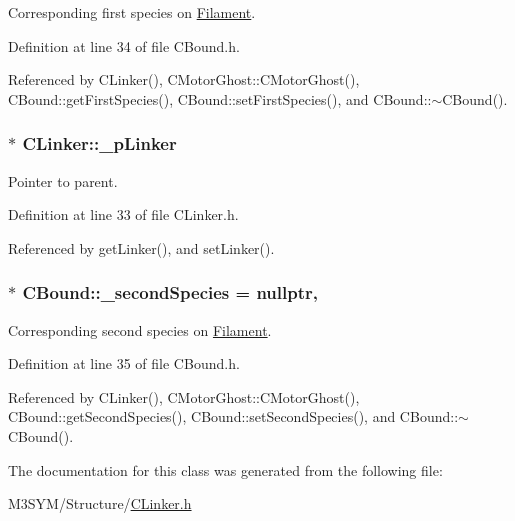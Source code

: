 Corresponding first species on \hyperlink{classFilament}{Filament}. 



Definition at line 34 of file C\+Bound.\+h.



Referenced by C\+Linker(), C\+Motor\+Ghost\+::\+C\+Motor\+Ghost(), C\+Bound\+::get\+First\+Species(), C\+Bound\+::set\+First\+Species(), and C\+Bound\+::$\sim$\+C\+Bound().

\hypertarget{classCLinker_a5cb1a9ff49e6d394ab980ff01af23ebc}{
\subsubsection[{\+\_\+p\+Linker}]{$\ast$ C\+Linker\+::\+\_\+p\+Linker\hspace{0.3cm}{\ttfamily [private]}}}\label{classCLinker_a5cb1a9ff49e6d394ab980ff01af23ebc}


Pointer to parent. 



Definition at line 33 of file C\+Linker.\+h.



Referenced by get\+Linker(), and set\+Linker().

\hypertarget{classCBound_ae6818ab861d273598a2507be75183e41}{
\subsubsection[{\+\_\+second\+Species}]{$\ast$ C\+Bound\+::\+\_\+second\+Species = nullptr\hspace{0.3cm}{\ttfamily [protected]}, {\ttfamily [inherited]}}}\label{classCBound_ae6818ab861d273598a2507be75183e41}


Corresponding second species on \hyperlink{classFilament}{Filament}. 



Definition at line 35 of file C\+Bound.\+h.



Referenced by C\+Linker(), C\+Motor\+Ghost\+::\+C\+Motor\+Ghost(), C\+Bound\+::get\+Second\+Species(), C\+Bound\+::set\+Second\+Species(), and C\+Bound\+::$\sim$\+C\+Bound().



The documentation for this class was generated from the following file\+:\begin{DoxyCompactItemize}
\item 
M3\+S\+Y\+M/\+Structure/\hyperlink{CLinker_8h}{C\+Linker.\+h}\end{DoxyCompactItemize}
